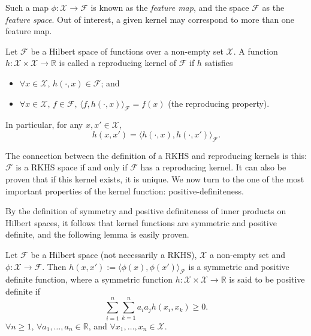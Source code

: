 Such a map $\phi:\mathcal X \rightarrow \mathcal F$ is known as the \textit{feature map}, and the space $\mathcal F$ as the \textit{feature space}. Out of interest, a given kernel may correspond to more than one feature map.

\begin{definition}\label{def:repkern}
	Let $\mathcal F$ be a Hilbert space of functions over a non-empty set $\mathcal X$. A function $h:\mathcal X\times\mathcal X\rightarrow\mathbb R$ is called a reproducing kernel of $\mathcal F$ if $h$ satisfies
	\begin{itemize}
	\vspace{-1mm}
	\item $\forall x \in \mathcal X,\, h(\cdot, x) \in \mathcal F$; and
	\vspace{-1mm}
	\item $\forall x \in \mathcal X, \, f \in \mathcal F, \, \langle f, h(\cdot, x) \rangle_{\mathcal F} = f(x)$ (the reproducing property).
	\end{itemize}
	\vspace{-1mm}
	In particular, for any $x, x' \in \mathcal X$,
	\[
		h(x,x') = \langle h(\cdot, x), h(\cdot, x') \rangle_{\mathcal F}.
	\]
\end{definition}

\vspace{-1mm}
The connection between the definition of a RKHS and reproducing kernels is this: $\mathcal F$ is a RKHS space if and only if $\mathcal F$ has a reproducing kernel. It can also be proven that if this kernel exists, it is unique. We now turn to the one of the most important properties of the kernel function: positive-definiteness.

By the definition of symmetry and positive definiteness of inner products on Hilbert spaces, it follows that kernel functions are symmetric and positive definite, and the following lemma is easily proven.

\begin{lemma}\label{lemma:posdef}
	Let $\mathcal F$ be a Hilbert space (not necessarily a RKHS), $\mathcal X$ a non-empty set and $\phi:\mathcal X \rightarrow \mathcal F$. Then $h(x,x') := \langle \phi(x), \phi(x') \rangle_{\mathcal F}$ is a symmetric and positive definite function, where a symmetric function $h:\mathcal X\times\mathcal X\rightarrow\mathbb R$ is said to be  positive definite if
	\[
		\sum_{i=1}^n\sum_{k=1}^n a_ia_jh(x_i, x_k) \geq 0.
	\]
	$\forall n \geq 1$, $\forall a_1, \dots, a_n \in \mathbb R$, and $\forall x_1, \dots, x_n \in \mathcal X$.
\end{lemma}

